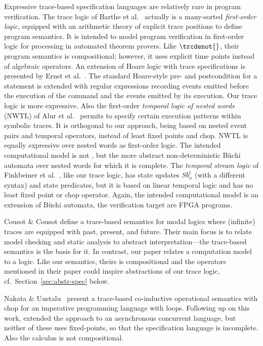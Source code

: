 \documentclass[a4paper,numberwithinsect]{lipics-v2021}
\begin{document}
Expressive trace-based specification languages are relatively rare in
program verification.
% 
The trace logic of Barthe et al.~\cite{BEGGKM19} actually is a
many-sorted \emph{first-order logic}, equipped with an arithmetic
theory of explicit trace positions to define program semantics. It is
intended to model program verification in first-order logic for
processing in automated theorem provers. Like $\trcdenot{}$, their
program semantics is compositional; however, it uses explicit time
points instead of algebraic operators.
%
An extension of Hoare logic with trace specifications is presented by
Ernst et al.~\cite{ErnstKM22}.  The standard Hoare-style pre- and
postcondition for a statement is extended with regular expressions
recording events emitted before the execution of the command and the
events emitted by its execution. Our trace logic is more expressive.
%
Also the first-order \emph{temporal logic of nested words} (NWTL) of
Alur et al.~\cite{AABEIL08} permits to specify certain execution
patterns within symbolic traces. It is orthogonal to our approach,
being based on nested event pairs and temporal operators, instead of
least fixed points and chop. NWTL is equally expressive over nested
words as first-order logic. The intended computational model is not
\Rec, but the more abstract non-deterministic Büchi automata over
nested words for which it is complete.
%
The \emph{temporal stream logic} of Finkbeiner et al.~\cite{FKPS19},
like our trace logic, has state updates $\mathit{Sb}_x^t$ (with a
different syntax) and state predicates, but it is based on linear
temporal logic and has no least fixed point or chop operator. Again,
the intended computational model is an extension of Büchi automata,
the verification target are FPGA programs.

Cousot \& Cousot \cite{CousotCousot00} define a trace-based semantics
for modal logics where (infinite) traces are equipped with past,
present, and future. Their main focus is to relate model checking and
static analysis to abstract interpretation---the trace-based semantics
is the basis for it. In contrast, our paper relates a computation
model to a logic. Like our semantics, theirs is compositional and the
operators mentioned in their paper could inspire abstractions of our
trace logic, cf.~Section~\ref{sec:abstr-spec} below.

Nakata \& Uustalu~\cite{nak-uus-09} present a trace-based co-inductive
operational semantics with chop for an imperative programming language
with loops. Following up on this work, \cite{DHJPT17} extended the
approach to an asynchronous concurrent language, but neither of these
uses fixed-points, so that the specification language is
incomplete. Also the calculus is not compositional.
\end{document}
